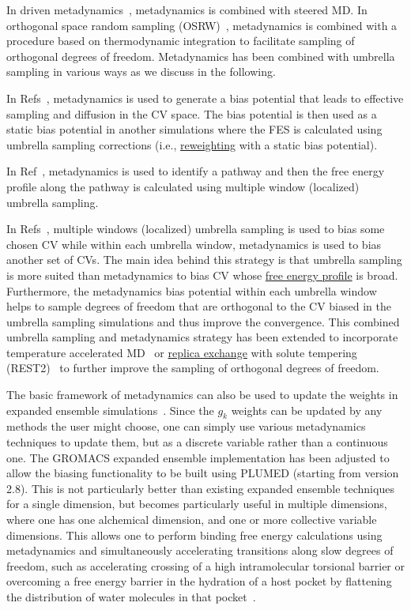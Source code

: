 \documentclass[9pt,review]{livecoms}
\begin{document}
In driven metadynamics~\cite{Moradi_DrivenMetaD_JPCL2013}, metadynamics is combined with steered MD.
In orthogonal space random sampling (OSRW)~\cite{Zheng_OSRW-1_PNAS2008,Zheng_OSRW-2_JCP2009,Min_OSRW-3_JCTC2010}, metadynamics is combined with a procedure based on thermodynamic integration to facilitate sampling of orthogonal degrees of freedom. Metadynamics has been combined with umbrella sampling in various ways as we discuss in the following.

In Refs~\cite{Badin_MetaD-US-1_JCP2006,Autieri_MetaD-US-2_JCP2010}, metadynamics is used to generate a bias potential that leads to effective sampling and diffusion in the CV space. The bias potential is then used as a static bias potential in another simulations where the FES is calculated using umbrella sampling corrections (i.e., \hyperlink{ref:Reweighting} {reweighting} with a static bias potential).

In Ref~\cite{Zhang_MetaD-US-3_JCTC2013}, metadynamics is used to identify a pathway and then the free energy profile along the pathway is calculated using multiple window (localized) umbrella sampling.

In Refs~\cite{Johnston_MetaD-US-4_PLos2012,Awasthi_MetaD-US-5_JCC2016}, multiple windows (localized) umbrella sampling is used to bias some chosen CV while within each umbrella window, metadynamics is used to bias another set of CVs. The main idea behind this strategy is that umbrella sampling is more suited than metadynamics to bias CV whose \hyperlink{ref:FES} {free energy profile} is broad. Furthermore, the metadynamics bias potential within each umbrella window helps to sample degrees of freedom that are orthogonal to the CV biased in the umbrella sampling simulations and thus improve the convergence. This combined umbrella sampling and metadynamics strategy has been extended to incorporate temperature accelerated MD~\cite{Awasthi_TASS_JCP2017,Pal_TASS-2_JCC2021} or \hyperlink{ref:ReplEx} {replica exchange} with solute tempering (REST2)~\cite{Kapakayala_WS-MetaD+REST2_JCC2021} to further improve the sampling of orthogonal degrees of freedom.

The basic framework of metadynamics can also be used to update the weights in expanded ensemble simulations~\cite{Hsu_alchemical_metadynamics}. Since the $g_k$ weights can be updated by any methods the user might choose, one can simply use various metadynamics techniques to update them, but as a discrete variable rather than a continuous one. The GROMACS expanded ensemble implementation has been adjusted to allow the biasing functionality to be built using PLUMED (starting from version 2.8). This is not particularly better than existing expanded ensemble techniques for a single dimension, but becomes particularly useful in multiple dimensions, where one has one alchemical dimension, and one or more collective variable dimensions.  This allows one to perform binding free energy calculations using metadynamics and simultaneously accelerating transitions along slow degrees of freedom, such as accelerating crossing of a high intramolecular torsional barrier or overcoming a free energy barrier in the hydration of a host pocket by flattening the distribution of water molecules in that pocket~\cite{Hsu_alchemical_metadynamics}.
\end{document}
